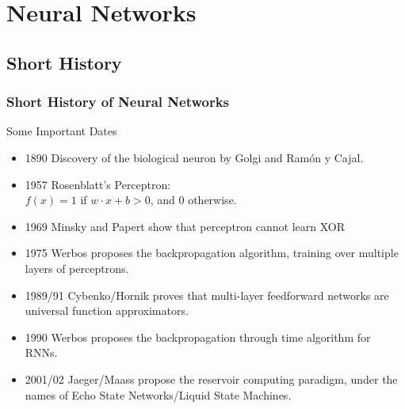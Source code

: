 \documentclass{beamer}
\begin{document}
\section{Neural Networks}
\subsection{Short History}

\begin{frame}
\frametitle{Short History of Neural Networks}

\begin{block}{Some Important Dates}
	\begin{itemize}
	\item 1890 Discovery of the biological neuron by Golgi and Ram\'{o}n y Cajal.
    \item 1957 Rosenblatt's Perceptron:\\ $f(x) = 1$ if $w \cdot x + b>0$, and $0$ otherwise.
    \item 1969 Minsky and Papert show that perceptron cannot learn XOR 
    \item 1975 Werbos proposes the backpropagation algorithm, training over multiple layers of perceptrons.
    \item 1989/91 Cybenko/Hornik proves that multi-layer feedforward networks are universal function approximators.
	\item 1990 Werbos proposes the backpropagation through time algorithm for RNNs.
	\item 2001/02 Jaeger/Maass propose the reservoir computing paradigm, under the names of Echo State Networks/Liquid State Machines.
    \end{itemize}
   
\end{block}
\end{frame}


\end{document}
